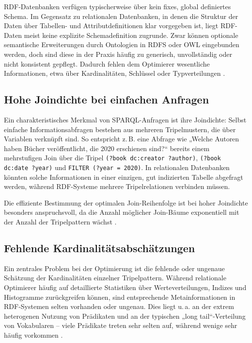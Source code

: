 \documentclass[12pt]{article}
\begin{document}
RDF-Datenbanken verfügen typischerweise über kein fixes, global definiertes Schema. Im Gegensatz zu relationalen Datenbanken, in denen die Struktur der Daten über Tabellen- und Attributdefinitionen klar vorgegeben ist, liegt RDF-Daten meist keine explizite Schemadefinition zugrunde. Zwar können optionale semantische Erweiterungen durch Ontologien in RDFS oder OWL eingebunden werden, doch sind diese in der Praxis häufig zu generisch, unvollständig oder nicht konsistent gepflegt. Dadurch fehlen dem Optimierer wesentliche Informationen, etwa über Kardinalitäten, Schlüssel oder Typverteilungen \cite{harth2010sparqling}.

\subsection{Hohe Joindichte bei einfachen Anfragen}

Ein charakteristisches Merkmal von SPARQL-Anfragen ist ihre Joindichte: Selbst einfache Informationsabfragen bestehen aus mehreren Tripelmustern, die über Variablen verknüpft sind. So entspricht z.\,B. eine Abfrage wie „Welche Autoren haben Bücher veröffentlicht, die 2020 erschienen sind?“ bereits einem mehrstufigen Join über die Tripel \texttt{(?book dc:creator ?author)}, \texttt{(?book dc:date ?year)} und \texttt{FILTER (?year = 2020)}. In relationalen Datenbanken könnten solche Informationen in einer einzigen, gut indizierten Tabelle abgefragt werden, während RDF-Systeme mehrere Tripelrelationen verbinden müssen.

Die effiziente Bestimmung der optimalen Join-Reihenfolge ist bei hoher Joindichte besonders anspruchsvoll, da die Anzahl möglicher Join-Bäume exponentiell mit der Anzahl der Tripelpattern wächst \cite{gubichev2013sparql}.

\subsection{Fehlende Kardinalitätsabschätzungen}

Ein zentrales Problem bei der Optimierung ist die fehlende oder ungenaue Schätzung der Kardinalitäten einzelner Tripelpattern. Während relationale Optimierer häufig auf detaillierte Statistiken über Werteverteilungen, Indizes und Histogramme zurückgreifen können, sind entsprechende Metainformationen in RDF-Systemen selten vorhanden oder ungenau. Dies liegt u.\,a. an der extrem heterogenen Nutzung von Prädikaten und an der typischen „long tail“-Verteilung von Vokabularen – viele Prädikate treten sehr selten auf, während wenige sehr häufig vorkommen \cite{stahl2012rdf}.
\end{document}
